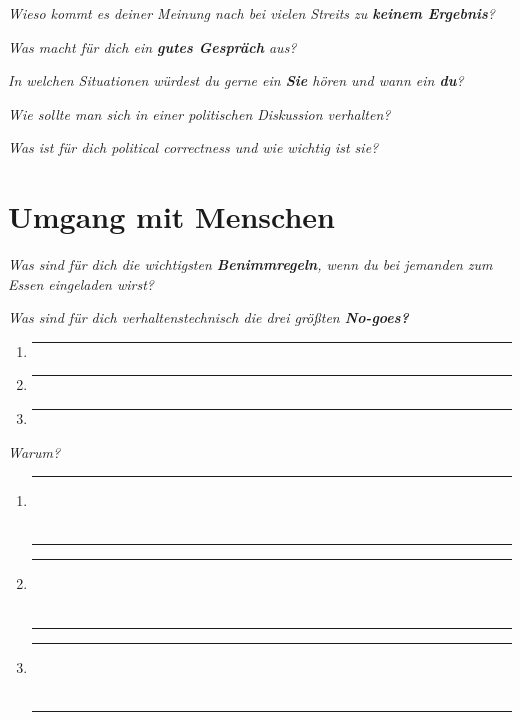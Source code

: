 \documentclass[a4paper,12pt]{scrartcl}
\newcommand{\hfilloutline}[1]{\rule{#1}{0.5pt}}
\newcommand{\frage}[1]{\textit{#1}}
\renewcommand{\emph}[1]{\textbf{#1}}
\begin{document}
\frage{Wieso kommt es deiner Meinung nach bei vielen Streits zu \emph{keinem Ergebnis}?}
\vspace{3cm}

\frage{Was macht für dich ein \emph{gutes Gespräch} aus?}
\vspace{4cm}

\frage{In welchen Situationen würdest du gerne ein \emph{Sie} hören und wann ein \emph{du}?}
\vspace{3cm}

\frage{Wie sollte man sich in einer politischen Diskussion verhalten?}
\vspace{7cm}

\frage{Was ist für dich political correctness und wie wichtig ist sie?}
\vspace{3cm}

\newpage

   


\section*{Umgang mit Menschen}
\frage{Was sind für dich die wichtigsten \emph{Benimmregeln}, wenn du bei jemanden zum Essen eingeladen wirst?}
\vspace{5cm}

\frage{Was sind für dich verhaltenstechnisch die drei größten \emph{No-goes?}}
\begin{enumerate}
    \item \hfill\hfilloutline{15cm}
    \item \hfill\hfilloutline{15cm}
    \item \hfill\hfilloutline{15cm}
\end{enumerate}
\frage{Warum?}
\begin{enumerate}
    \item \hfill\hfilloutline{15cm}\\ \\ \hfill\hfilloutline{15cm}
    \item \hfill\hfilloutline{15cm}\\ \\ \hfill\hfilloutline{15cm}
    \item \hfill\hfilloutline{15cm}\\ \\ \hfill\hfilloutline{15cm}
\end{enumerate}
\newpage
\end{document}

